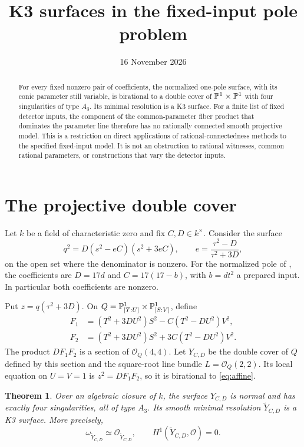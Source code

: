 \documentclass[11pt,a4paper]{article}
\title{K3 surfaces in the fixed-input pole problem}
\author{}\date{16 November 2026}
\newtheorem{theorem}{Theorem}[section]
\newcommand{\OO}{\mathcal O}
\begin{document}
\maketitle
\begin{abstract}
For every fixed nonzero pair of coefficients, the normalized one-pole
surface, with its conic parameter still variable, is birational to a
double cover of $\mathbb P^1\times\mathbb P^1$ with four singularities of type
$A_3$. Its minimal resolution is a K3 surface. For a finite list of
fixed detector inputs, the component of the common-parameter fiber
product that dominates the parameter line therefore has no rationally
connected smooth projective model. This is a restriction on direct
applications of rational-connectedness methods to the specified
fixed-input model. It is not an obstruction to rational witnesses,
common rational parameters, or constructions that vary the detector
inputs.
\end{abstract}

\section{The projective double cover}

Let $k$ be a field of characteristic zero and fix $C,D\in k^\times$.
Consider the surface
\begin{equation}\label{eq:affine}
 q^2=D(s^2-eC)(s^2+3eC),\qquad
 e=\frac{\tau^2-D}{\tau^2+3D},
\end{equation}
on the open set where the denominator is nonzero. For the normalized
pole of \cite{Guards}, the coefficients are $D=17d$ and
$C=17(17-b)$, with $b=dt^2$ a prepared input. In particular both
coefficients are nonzero.

Put $z=q(\tau^2+3D)$. On
$Q=\mathbb P^1_{[T:U]}\times\mathbb P^1_{[S:V]}$, define
\begin{equation}\label{eq:branch}
\begin{aligned}
 F_1&=(T^2+3DU^2)S^2-C(T^2-DU^2)V^2,\\
 F_2&=(T^2+3DU^2)S^2+3C(T^2-DU^2)V^2.
\end{aligned}
\end{equation}
The product $DF_1F_2$ is a section of $\OO_Q(4,4)$.
Let $Y_{C,D}$ be the double cover of $Q$ defined by this section
and the square-root line bundle $L=\OO_Q(2,2)$. Its local equation
on $U=V=1$ is $z^2=DF_1F_2$, so it is birational to
\eqref{eq:affine}.

\begin{theorem}\label{thm:k3}
Over an algebraic closure of $k$, the surface $Y_{C,D}$ is normal
and has exactly four singularities, all of type $A_3$. Its smooth
minimal resolution $\widetilde Y_{C,D}$ is a K3 surface. More
precisely,
\[
 \omega_{\widetilde Y_{C,D}}\simeq\OO_{\widetilde Y_{C,D}},\qquad
 H^1(\widetilde Y_{C,D},\OO)=0.
\]
\end{theorem}
\end{document}
